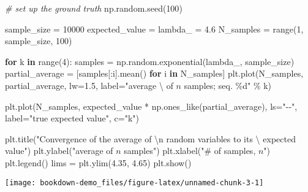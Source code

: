\documentclass[]{tufte-book}
\newenvironment{Shaded}{}{}
\newcommand{\BuiltInTok}[1]{#1}
\newcommand{\CharTok}[1]{\textcolor[rgb]{0.25,0.44,0.63}{#1}}
\newcommand{\CommentTok}[1]{\textcolor[rgb]{0.38,0.63,0.69}{\textit{#1}}}
\newcommand{\ControlFlowTok}[1]{\textcolor[rgb]{0.00,0.44,0.13}{\textbf{#1}}}
\newcommand{\DecValTok}[1]{\textcolor[rgb]{0.25,0.63,0.44}{#1}}
\newcommand{\FloatTok}[1]{\textcolor[rgb]{0.25,0.63,0.44}{#1}}
\newcommand{\KeywordTok}[1]{\textcolor[rgb]{0.00,0.44,0.13}{\textbf{#1}}}
\newcommand{\NormalTok}[1]{#1}
\newcommand{\OperatorTok}[1]{\textcolor[rgb]{0.40,0.40,0.40}{#1}}
\newcommand{\SpecialCharTok}[1]{\textcolor[rgb]{0.25,0.44,0.63}{#1}}
\newcommand{\StringTok}[1]{\textcolor[rgb]{0.25,0.44,0.63}{#1}}
\theoremstyle{definition}
\theoremstyle{definition}
\theoremstyle{definition}
\theoremstyle{remark}
\begin{document}
\begin{Shaded}
\begin{Highlighting}[]
\CommentTok{\# set up the ground truth}
\NormalTok{np.random.seed(}\DecValTok{100}\NormalTok{)}

\NormalTok{sample\_size }\OperatorTok{=} \DecValTok{10000}
\NormalTok{expected\_value }\OperatorTok{=}\NormalTok{ lambda\_ }\OperatorTok{=} \FloatTok{4.6}
\NormalTok{N\_samples }\OperatorTok{=} \BuiltInTok{range}\NormalTok{(}\DecValTok{1}\NormalTok{, sample\_size, }\DecValTok{100}\NormalTok{)}

\ControlFlowTok{for}\NormalTok{ k }\KeywordTok{in} \BuiltInTok{range}\NormalTok{(}\DecValTok{4}\NormalTok{):}
\NormalTok{    samples }\OperatorTok{=}\NormalTok{ np.random.exponential(lambda\_, sample\_size)}
\NormalTok{    partial\_average }\OperatorTok{=}\NormalTok{ [samples[:i].mean() }\ControlFlowTok{for}\NormalTok{ i }\KeywordTok{in}\NormalTok{ N\_samples]}
\NormalTok{    plt.plot(N\_samples, partial\_average, lw}\OperatorTok{=}\FloatTok{1.5}\NormalTok{, label}\OperatorTok{=}\StringTok{"average \textbackslash{}}
\StringTok{    of  $n$ samples; seq. }\SpecialCharTok{\%d}\StringTok{"} \OperatorTok{\%}\NormalTok{ k)}

\NormalTok{plt.plot(N\_samples, expected\_value }\OperatorTok{*}\NormalTok{ np.ones\_like(partial\_average),}
\NormalTok{         ls}\OperatorTok{=}\StringTok{"{-}{-}"}\NormalTok{, label}\OperatorTok{=}\StringTok{"true expected value"}\NormalTok{, c}\OperatorTok{=}\StringTok{"k"}\NormalTok{)}

\NormalTok{plt.title(}\StringTok{"Convergence of the average of }\CharTok{\textbackslash{}n}\StringTok{ random variables to its \textbackslash{}}
\StringTok{expected value"}\NormalTok{)}
\NormalTok{plt.ylabel(}\StringTok{"average of $n$ samples"}\NormalTok{)}
\NormalTok{plt.xlabel(}\StringTok{"\# of samples, $n$"}\NormalTok{)}
\NormalTok{plt.legend()}
\NormalTok{lims }\OperatorTok{=}\NormalTok{ plt.ylim(}\FloatTok{4.35}\NormalTok{, }\FloatTok{4.65}\NormalTok{)}
\NormalTok{plt.show()}
\end{Highlighting}
\end{Shaded}

\texttt{[image: bookdown-demo\_files/figure-latex/unnamed-chunk-3-1]}
\end{document}

